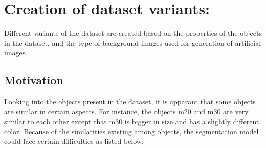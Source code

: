 \documentclass[paper=a4,11pt,parskip=half,toc=listof]{scrartcl}
\begin{document}
\section{Creation of dataset variants:}
Different variants of the dataset are created based on the properties of the objects in the dataset, and the type of  background images used for generation of artificial images.
	\subsection{Motivation}
		Looking into the objects present in the dataset, it is apparant that some objects are similar in certain aspects. For instance, the objects m20 and m30 are very similar to each other except that m30 is bigger in size and has a slightly different color. Because of the similarities existing among objects, the segmentation model could face certain difficulties as listed below:
\end{document}
